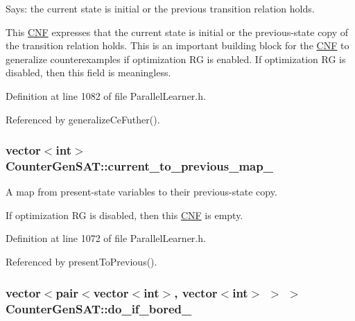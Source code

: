 Says\-: the current state is initial or the previous transition relation holds. 

This \hyperlink{classCNF}{C\-N\-F} expresses that the current state is initial or the previous-\/state copy of the transition relation holds. This is an important building block for the \hyperlink{classCNF}{C\-N\-F} to generalize counterexamples if optimization R\-G is enabled. If optimization R\-G is disabled, then this field is meaningless. 

Definition at line 1082 of file Parallel\-Learner.\-h.



Referenced by generalize\-Ce\-Futher().

\hypertarget{classCounterGenSAT_acdb06a8e09c3c017dbda36d37fab5998}{
\subsubsection[{current\-\_\-to\-\_\-previous\-\_\-map\-\_\-}]{\setlength{\rightskip}{0pt plus 5cm}vector$<$int$>$ Counter\-Gen\-S\-A\-T\-::current\-\_\-to\-\_\-previous\-\_\-map\-\_\-\hspace{0.3cm}{\ttfamily [protected]}}}\label{classCounterGenSAT_acdb06a8e09c3c017dbda36d37fab5998}


A map from present-\/state variables to their previous-\/state copy. 

If optimization R\-G is disabled, then this \hyperlink{classCNF}{C\-N\-F} is empty. 

Definition at line 1072 of file Parallel\-Learner.\-h.



Referenced by present\-To\-Previous().

\hypertarget{classCounterGenSAT_ae4f7bf80b40a44580fde913f300ac4c1}{
\subsubsection[{do\-\_\-if\-\_\-bored\-\_\-}]{\setlength{\rightskip}{0pt plus 5cm}vector$<$pair$<$vector$<$int$>$, vector$<$int$>$ $>$ $>$ Counter\-Gen\-S\-A\-T\-::do\-\_\-if\-\_\-bored\-\_\-\hspace{0.3cm}{\ttfamily [protected]}}}\label{classCounterGenSAT_ae4f7bf80b40a44580fde913f300ac4c1}


